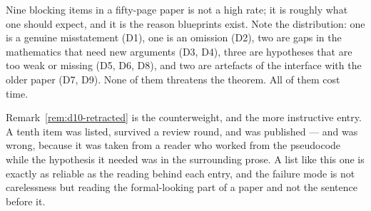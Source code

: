 \begin{remark}\label{rem:defects-meaning}
Nine blocking items in a fifty-page paper is not a high rate; it is roughly what
one should expect, and it is the reason blueprints exist. Note the
distribution: one is a genuine misstatement (D1), one is an omission (D2), two
are gaps in the mathematics that need new arguments (D3, D4), three are
hypotheses that are too weak or missing (D5, D6, D8), and two are artefacts of
the interface with the older paper (D7, D9). None of them threatens the
theorem. All of them cost time.

Remark~\ref{rem:d10-retracted} is the counterweight, and the more instructive
entry. A tenth item was listed, survived a review round, and was published ---
and was wrong, because it was taken from a reader who worked from the pseudocode
while the hypothesis it needed was in the surrounding prose. A list like this
one is exactly as reliable as the reading behind each entry, and the failure
mode is not carelessness but reading the formal-looking part of a paper and not
the sentence before it.
\end{remark}

